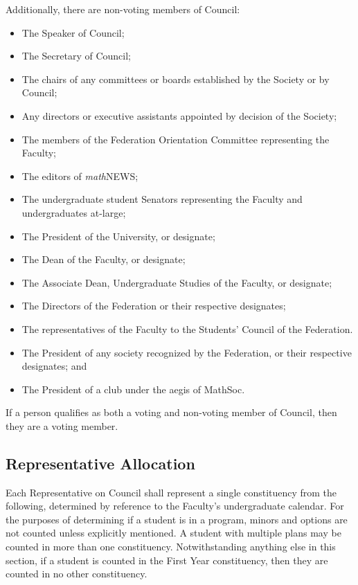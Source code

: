 \noindent Additionally, there are non-voting members of Council:
\begin{itemize}
  \item The Speaker of Council;
  \item The Secretary of Council;
  \item The chairs of any committees or boards established by the Society or by
    Council;
  \item Any directors or executive assistants appointed by decision of the
    Society;
  \item The members of the Federation Orientation Committee representing the
    Faculty;
  \item The editors of \emph{math}{\sf NEWS};
  \item The undergraduate student Senators representing the Faculty and
    undergraduates at-large;
  \item The President of the University, or designate;
  \item The Dean of the Faculty, or designate;
  \item The Associate Dean, Undergraduate Studies of the Faculty, or designate;
  \item The Directors of the Federation or their respective designates;
  \item The representatives of the Faculty to the Students' Council of the
    Federation.
  \item The President of any society recognized by the Federation, or their
    respective designates; and
  \item The President of a club under the aegis of MathSoc.
\end{itemize}

If a person qualifies as both a voting and non-voting member of Council, then
they are a voting member.

\subsection{Representative Allocation}
Each Representative on Council shall represent a single constituency from the
following, determined by reference to the Faculty's undergraduate calendar. For
the purposes of determining if a student is in a program, minors and options are
not counted unless explicitly mentioned. A student with multiple plans may be
counted in more than one constituency. Notwithstanding anything else in this
section, if a student is counted in the First Year constituency, then they are
counted in no other constituency.

